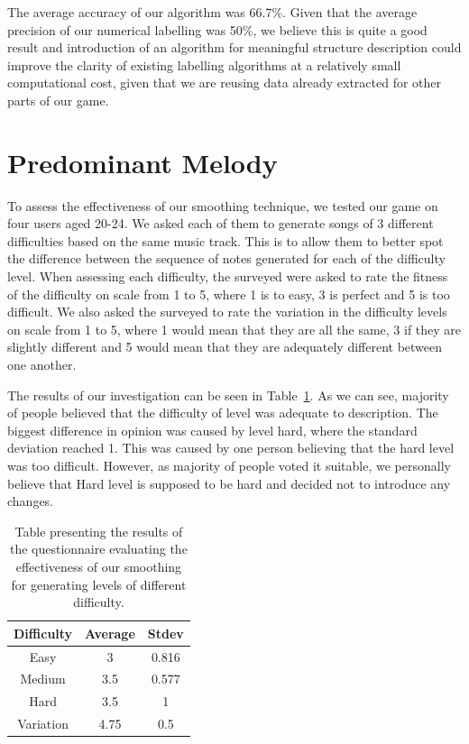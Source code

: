 The average accuracy of our algorithm was 66.7\%. Given that the average precision of our numerical labelling was 50\%, we believe this is quite a good result and introduction of an algorithm for meaningful structure description could improve the clarity of existing labelling algorithms at a relatively small computational cost, given that we are reusing data already extracted for other parts of our game.

\vspace{20pt}

\section{Predominant Melody}

To assess the effectiveness of our smoothing technique, we tested our game on four users aged 20-24. We asked each of them to generate songs of 3 different difficulties based on the same music track. This is to allow them to better spot the difference between the sequence of notes generated for each of the difficulty level. When assessing each difficulty, the surveyed were asked to rate the fitness of the difficulty on scale from 1 to 5, where 1 is to easy, 3 is perfect and 5 is too difficult. We also asked the surveyed to rate the variation in the difficulty levels on scale from 1 to 5, where 1 would mean that they are all the same, 3 if they are slightly different and 5 would mean that they are adequately different between one another. 

The results of our investigation can be seen in Table~\ref{table:smoothing}. As we can see, majority of people believed that the difficulty of level was adequate to description. The biggest difference in opinion was caused by level hard, where the standard deviation reached 1. This was caused by one person believing that the hard level was too difficult. However, as majority of people voted it suitable, we personally believe that Hard level is supposed to be hard and decided not to introduce any changes. 

\begin{table}
\begin{center}
\begin{tabular}{| c | c | c | } 																								      \hline 
\textbf{Difficulty} & \textbf{Average} & \textbf{Stdev} \\ \hline \hline
Easy 				& 3 					   & 0.816  			   \\ \hline 
Medium 			& 3.5 			   	   & 0.577		 	   \\ \hline 
Hard					& 3.5 				   & 1  		 	  	   \\ \hline \hline
Variation			& 4.75				   & 0.5				   \\ \hline
\end{tabular}
\caption{Table presenting the results of the questionnaire evaluating the effectiveness of our smoothing for generating levels of different difficulty.}
\label{table:smoothing}
\end{center}
\end{table}

